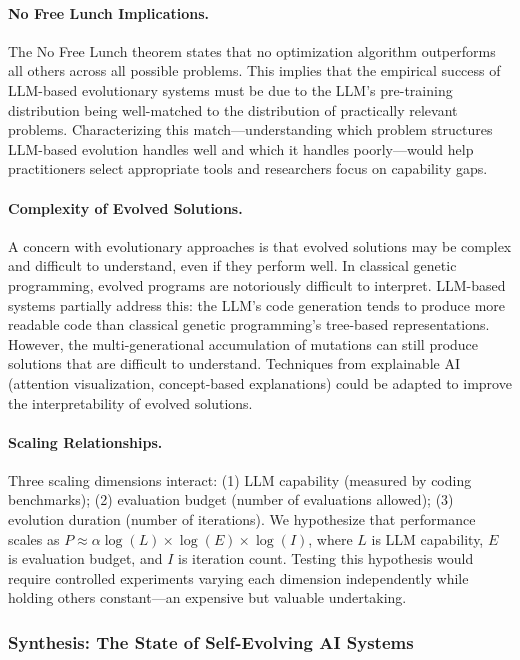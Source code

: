 \paragraph{No Free Lunch Implications.}
The No Free Lunch theorem states that no optimization algorithm outperforms all others across all possible problems. This implies that the empirical success of LLM-based evolutionary systems must be due to the LLM's pre-training distribution being well-matched to the distribution of practically relevant problems. Characterizing this match---understanding which problem structures LLM-based evolution handles well and which it handles poorly---would help practitioners select appropriate tools and researchers focus on capability gaps.

\paragraph{Complexity of Evolved Solutions.}
A concern with evolutionary approaches is that evolved solutions may be complex and difficult to understand, even if they perform well. In classical genetic programming, evolved programs are notoriously difficult to interpret. LLM-based systems partially address this: the LLM's code generation tends to produce more readable code than classical genetic programming's tree-based representations. However, the multi-generational accumulation of mutations can still produce solutions that are difficult to understand. Techniques from explainable AI (attention visualization, concept-based explanations) could be adapted to improve the interpretability of evolved solutions.

\paragraph{Scaling Relationships.}
Three scaling dimensions interact: (1) LLM capability (measured by coding benchmarks); (2) evaluation budget (number of evaluations allowed); (3) evolution duration (number of iterations). We hypothesize that performance scales as $P \approx \alpha \log(L) \times \log(E) \times \log(I)$, where $L$ is LLM capability, $E$ is evaluation budget, and $I$ is iteration count. Testing this hypothesis would require controlled experiments varying each dimension independently while holding others constant---an expensive but valuable undertaking.


\subsubsection{Synthesis: The State of Self-Evolving AI Systems}

